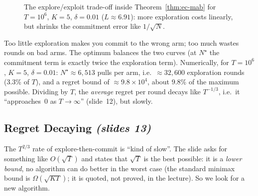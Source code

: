 \documentclass[11pt,a4paper]{article}
\newcommand{\slides}[1]{\emph{(slides #1)}}
\theoremstyle{plain}
\theoremstyle{definition}
\theoremstyle{remark}
\begin{document}
\begin{figure}[ht]
\centering
{}
\caption{The explore/exploit trade-off inside Theorem~\ref{thm:ec-mab} for $T=10^6$, $K=5$, $\delta=0.01$ ($L\approx6.91$):
more exploration costs linearly, but shrinks the commitment error like $1/\sqrt N$.}
\end{figure}

\begin{intuition}
Too little exploration makes you commit to the wrong arm; too much wastes rounds on bad arms. The optimum balances the
two curves (at $N^\star$ the commitment term is exactly twice the exploration term). Numerically, for $T=10^6$,
$K=5$, $\delta=0.01$: $N^\star\approx6{,}513$ pulls per arm, i.e.\ $\approx32{,}600$ exploration rounds (3.3\% of $T$), and
a regret bound of $\approx9.8\times10^4$, about $9.8\%$ of the maximum possible. Dividing by $T$, the \emph{average}
regret per round decays like $T^{-1/3}$, i.e.\ it ``approaches~0 as $T\to\infty$'' (slide~12), but slowly.
\end{intuition}

\subsection{Regret Decaying \slides{13}}

The $T^{2/3}$ rate of explore-then-commit is ``kind of slow''. The slide asks for something like $O(\sqrt T)$ and states that
$\sqrt T$ is the best possible: it is a \emph{lower bound}, no algorithm can do better in the worst case
(the standard minimax bound is $\Omega(\sqrt{KT})$; it is quoted, not proved, in the lecture). So we look for a new algorithm.
\end{document}
